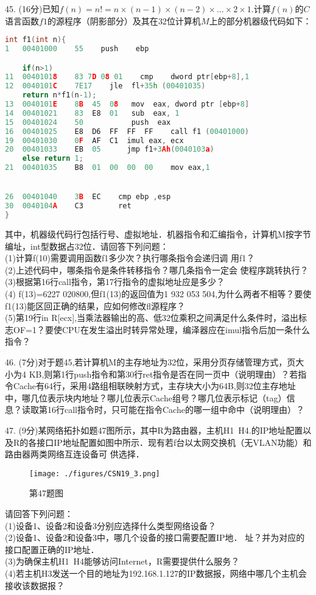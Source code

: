 45. (16分)已知$f(n)=n!=n\times(n-1)\times(n-2)\times...\times2\times1$.计算$f(n)$的$C$语言函数$f1$的源程序（阴影部分）及其在$32$位计算机$M$上的部分机器级代码如下：
\begin{lstlisting}[language=cpp]
int f1(int n){
1   00401000    55    push    ebp

    if(n>1)
11  00401018    83 7D 08 01    cmp    dword ptr[ebp+8],1
12  0040101C    7E17    jle  fl+35h (00401035)
    return n*f1(n-1);
13  0040101E    8B  45  08   mov  eax, dword ptr [ebp+8]
14  00401021    83  E8  01   sub  eax, 1
15  00401024    50           push  eax
16  00401025    E8  D6  FF  FF  FF    call f1 (00401000)
19  00401030    0F  AF  C1  imul eax, ecx
20  00401033    EB  05      jmp f1+3Ah(0040103a)
    else return 1;
21  00401035    B8  01  00  00  00    mov eax,1


26  00401040    3B  EC    cmp ebp ,esp
30  0040104A    C3        ret
}
\end{lstlisting}
其中，机器级代码行包括行号、虚拟地址．机器指令和汇编指令，计算机M按字节编址，int型数据占32位．请回答下列问题： \\
(1)计算f(10)需要调用函数f1多少次？执行哪条指令会递归调
用f1？ \\
(2)上述代码中，哪条指令是条件转移指令？哪几条指令一定会
使程序跳转执行？  \\
(3)根据第16行call指令，第17行指令的虚拟地址应是多少？ \\
(4) f(13)=6227 020800,但f1(13)的返回值为1 932 053 504,为什么两者不相等？要使f1(13)能区回正确的结果，应如何修改fl源程序？ \\
(5)第19行in
R[ecx],当乘法器输出的高、低32位乘积之间满足什么条件时，溢出标志OF=1？要使CPU在发生溢出时转异常处理，编泽器应在imul指令后加一条什么指令？

46. (7分)对于题45,若计算机M的主存地址为32位，采用分页存储管理方式，页大小为4 KB,则第1行push指令和第30行ret指令是否在同一页中（说明理由）？若指令Cache有64行，采用4路组相联映射方式，主存块大小为64B,则32位主存地址中，哪几位表示块内地址？哪儿位表示Cache组号？哪几位表示标记（tag）信息？读取第16行call指令时，只可能在指令Cache的哪一组中命中（说明理由）？

47. (9分)某网络拓扑如题47图所示，其中R为路由器，主机H1~H4.的IP地址配置以及R的各接口IP地址配置如图中所示．现有若f台以太网交换机（无VLAN功能）和路由器两类网络互连设备可
供选择． \\
\begin{figure}[ht]
\centering
\texttt{[image: ./figures/CSN19\_3.png]}
\caption{第47题图} \label{CSN19_fig3}
\end{figure}
请回答下列问题： \\
(1)设备1、设备2和设备3分别应选择什么类型网络设备？  \\
(2)设备1、设备2和设备3中，哪几个设备的接口需要配置IP地．
址？并为对应的接口配置正确的IP地址． \\
(3)为确保主机H1~H4能够访问Internet，R需要提供什么服务？ \\
(4)若主机H3发送一个目的地址为192.168.1.127的IP数据报，网络中哪几个主机会接收该数据报？


